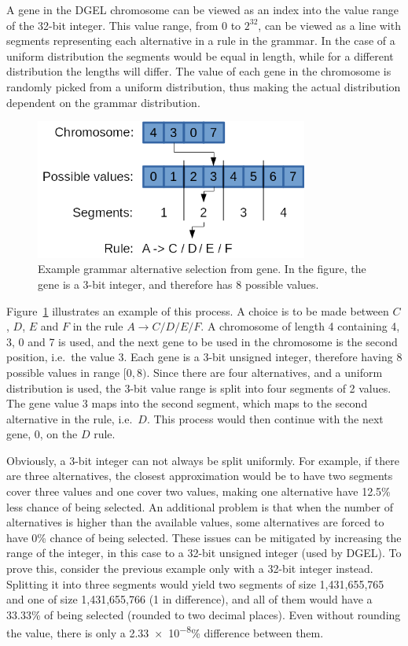 A gene in the \gls{DGEL} chromosome can be viewed as an index into the value range of the 32-bit integer.
This value range, from $0$ to $2^{32}$, can be viewed as a line with segments representing each alternative in a rule in the grammar.
In the case of a uniform distribution the segments would be equal in length, while for a different distribution the lengths will differ.
The value of each gene in the chromosome is randomly picked from a uniform distribution, thus making the actual distribution dependent on the grammar distribution.

\begin{figure}
    \centering
    \includegraphics[width=0.8\textwidth]{figures/gene}
    \caption[Example grammar alternative selection from gene]{Example grammar alternative selection from gene. In the figure, the gene is a 3-bit integer, and therefore has 8 possible values.}
    \label{fig:gene}
\end{figure}

Figure~\ref{fig:gene} illustrates an example of this process.
A choice is to be made between $C$, $D$, $E$ and $F$ in the rule $A \rightarrow C / D / E / F$.
A chromosome of length 4 containing 4, 3, 0 and 7 is used, and the next gene to be used in the chromosome is the second position, i.e.\ the value 3.
Each gene is a 3-bit unsigned integer, therefore having 8 possible values in range $[0, 8)$.
Since there are four alternatives, and a uniform distribution is used, the 3-bit value range is split into four segments of 2 values.
The gene value 3 maps into the second segment, which maps to the second alternative in the rule, i.e.\ $D$.
This process would then continue with the next gene, 0, on the $D$ rule.

Obviously, a 3-bit integer can not always be split uniformly.
For example, if there are three alternatives, the closest approximation would be to have two segments cover three values and one cover two values, making one alternative have 12.5\% less chance of being selected.
An additional problem is that when the number of alternatives is higher than the available values, some alternatives are forced to have 0\% chance of being selected.
These issues can be mitigated by increasing the range of the integer, in this case to a 32-bit unsigned integer (used by \gls{DGEL}).
To prove this, consider the previous example only with a 32-bit integer instead.
Splitting it into three segments would yield two segments of size 1,431,655,765 and one of size 1,431,655,766 (1 in difference), and all of them would have a 33.33\% of being selected (rounded to two decimal places).
Even without rounding the value, there is only a \num{2.33e-8}\% difference between them.

